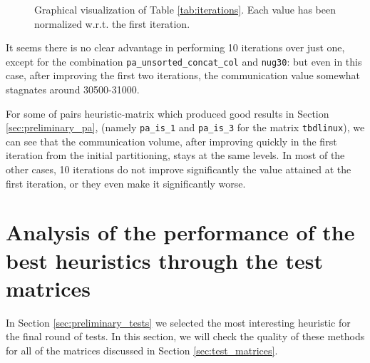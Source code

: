 \begin{figure}[h]
	\centering
	\caption{Graphical visualization of Table \ref{tab:iterations}. Each value has been normalized w.r.t. the first iteration. } \label{fig:iterations}
\end{figure}

It seems there is no clear advantage in performing 10 iterations over just one, except for the combination \verb|pa_unsorted_concat_col| and \verb|nug30|: but even in this case, after improving the first two iterations, the communication value somewhat stagnates around 30500-31000.

For some of pairs heuristic-matrix which produced good results in Section \ref{sec:preliminary_pa}, (namely \verb|pa_is_1| and \verb|pa_is_3| for the matrix \verb|tbdlinux|), we can see that the communication volume, after improving quickly in the first iteration from the initial partitioning, stays at the same levels. In most of the other cases, 10 iterations do not improve significantly the value attained at the first iteration, or they even make it significantly worse.

\section{Analysis of the performance of the best heuristics through the test matrices} \label{sec:final_tests}

In Section \ref{sec:preliminary_tests} we selected the most interesting heuristic for the final round of tests. In this section, we will check the quality of these methods for all of the matrices discussed in Section \ref{sec:test_matrices}.

